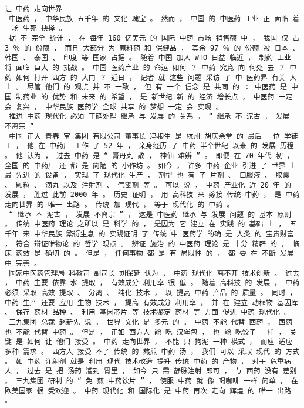 \documentclass{article}
\begin{document}
\begin{Verbatim}[commandchars=\\\{\}]
 让 中药 走向世界 
 中医药 ， 中华民族 五千年 的 文化 瑰宝 。 然而 ， 中国 的 中医药 工业 正 面临 着 一场 生死 抉择 。 
 据 不 完全 统计 ， 在 每年 160 亿美元 的 国际 中药 市场 销售额 中 ， 我国 仅 占 3 ％ 的 份额 ， 而且 大部分 为 原料药 和 保健品 ， 其余 97 ％ 的 份额 被 日本 、 韩国 、 泰国 、 印度 等 国家 占据 。 随着 中国 加入 WTO 日益 临近 ， 制药 工业 将 面临 巨大 的 挑战 。 中国 医药产业 的 命运 如何 ？ 中药 究竟 向 何处 去 ？ 中药 如何 打开 西方 的 大门 ？ 近日 ， 记者 就 这些 问题 采访 了 中 医药界 有关 人士 。 尽管 他们 的 观点 并 不 一致 ， 但 有 一个 信念 是 共同 的 ： 中医药 是 中国 制药业 的 优势 和 未来 的 希望 ， 是 新世纪 新 的 经济 增长点 ， 中医药 一定 会 复兴 ， 中华民族 医药学 全球 共享 的 梦想 一定 会 实现 。 
 推进 中药 现代化 必须 正确处理 继承 与 发展 的 关系 ， “ 继承 不 泥古 ， 发展 不离宗 ” 
 中国 正大 青春 宝 集团 有限公司 董事长 冯根生 是 杭州 胡庆余堂 的 最后 一位 学徒工 ， 他 在 中药厂 工作 了 52 年 ， 亲身经历 了 中药 半个世纪 以来 的 发展 历程 。 他 认为 ， 过去 中药 是 “ 膏丹丸 散 ， 神仙 难辨 ” 。 即便 在 70 年代 初 ， 全国 的 中药厂 还 都 是 简陋 的 小作坊 。 如今 ， 许多 中药 企业 引进 了 世界 上 最 先进 的 设备 ， 实现 了 现代化 生产 ， 剂型 也 有 了 片剂 、 口服液 、 胶囊 、 颗粒 、 滴丸 以及 注射剂 、 气雾剂 等 。 可以 说 ， 中药 产业化 近 20 年 的 发展 ， 胜过 此前 2000 年 。 历史 证明 ， 用 高科技 来 嫁接 传统 中药 ， 是 中药 走向世界 的 唯一 出路 。 传统 加 现代 ， 等于 现代化 的 中药 。 
 “ 继承 不 泥古 ， 发展 不离宗 ” ， 这是 中医药 继承 与 发展 问题 的 基本 原则 。 传统 中医药 理论 之所以 是 科学 的 ， 是因为 它 建立 在 实践 的 基础 上 ， 五千年 来 中华民族 繁衍生息 的 实践证明 了 传统 中 医药学 的确 是 人类 的 宝贵财富 ， 符合 辩证唯物论 的 哲学 观点 。 辨证 施治 的 中医药 理论 是 十分 精辟 的 ， 临床 药效 是 确切 的 。 但是 ， 任何事物 都 是 有 局限性 的 ， 都 要 在 不断 发展 中 完善 。 
 国家中医药管理局 科教司 副司长 刘保延 认为 ， 中药 现代化 离不开 技术创新 。 过去 ， 中药 主要 依靠 水 提取 ， 有效成分 利用率 很 低 。 随着 高科技 的 发展 ， 中药 必须 采取 高效 提取 、 分离 、 纯化 技术 ， 以 提高 中药 产品 的 质量 。 同时 ， 中药 生产 还要 应用 生物 技术 ， 提高 有效成分 利用率 ， 并 在 建立 动植物 基因库 、 保存 药材 品种 、 利用 基因芯片 等 技术鉴定 药材 等 方面 促进 中药 现代化 。 
 三九集团 总裁 赵新先 说 ， 世界 文化 是 多元 的 。 中药 不能 代替 西药 ， 西药 也 不能 代替 中药 。 但是 ， 正如 西方人 能 吃 汉堡包 ， 也 能 吃饺子 一样 ， 关键 是 如何 让 他们 接受 。 中药 走向世界 ， 不能 只 拘泥 一种 模式 ， 而应 适应 多种 需求 。 西方人 接受 不了 传统 的 熬煎 中药 汤 ， 我们 可以 采取 现代 的 方式 。 如 中药 注射剂 就是 利用 现代 技术改造 提升 传统 中药 的 产物 ， 对于 危重病 人 ， 过去 是 把 汤药 灌到 胃里 ， 如今 只 需 静脉注射 即可 ， 与 西药 没有 差别 。 三九集团 研制 的 “ 免 煎 中药饮片 ” ， 使服 中药 就 像 喝咖啡 一样 简单 ， 在 欧美国家 很 受欢迎 。 中药 现代化 和 国际化 是 中药 再次 走向 辉煌 的 唯一 出路 。 

\end{Verbatim}
\end{document}
